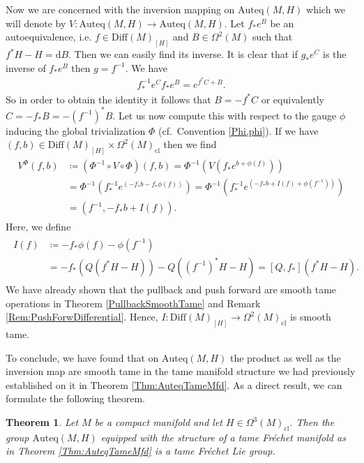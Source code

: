 \documentclass[12pt,a4paper]{article}
\theoremstyle{plain}
\newtheorem{theorem}{Theorem}[subsection]
\theoremstyle{definition}
\newcommand{\Forms}[1]{\Omega^{#1}(M)}
\newcommand{\ClForms}[1]{\Forms{#1}_{\mathrm{cl}}}
\newcommand{\SDiff}{\mathrm{Diff}(M)_{[H]}}
\newcommand{\Auteq}{\mathrm{Auteq}(M,H)}
\renewcommand{\d}{\mathrm{d}}
\begin{document}
Now we are concerned with the inversion mapping on $\Auteq$ which we will denote by $V:\Auteq\to\Auteq$.
Let $f_*e^B$ be an autoequivalence, i.e.
$f\in \SDiff$ and $B\in \Forms{2}$ such that $f^*H-H=\d B$. Then we can easily find its inverse. It is clear that if $g_*e^C$ is the inverse of $f_*e^B$ then $g=f^{-1}$. We have
\begin{align*}
    f^{-1}_*e^Cf_*e^B=e^{f^*C+B}.
\end{align*}
So in order to obtain the identity it follows that $B=-f^*C$ or equivalently
$C=-f_*B=-(f^{-1})^*B$. 
Let us now compute this with respect to the gauge $\phi$ inducing the global trivialization $\Phi$ (cf.~Convention \ref{Phi,phi}).
If we have $(f,b)\in \SDiff\times \ClForms{2}$ then we find
\begin{align}
\begin{split}
\label{Inv}
    V^\Phi(f,b)&\coloneqq (\Phi^{-1}\circ V\circ \Phi)(f,b)=\Phi^{-1}\left(V\left(f_*e^{b+\phi(f)}\right)\right)\\
    &=\Phi^{-1}\left(f^{-1}_*e^{(-f_*b-f_*\phi(f))}\right)=\Phi^{-1}\left(f^{-1}_*e^{(-f_*b+I(f)+\phi(f^{-1}))}\right)\\
    &=(f^{-1},-f_*b+I(f)).
\end{split}
\end{align}
Here, we define 
\begin{align}
\begin{split}
\label{I(f)}
    I(f)&\coloneqq -f_*\phi(f)-\phi(f^{-1})\\
    &= -f_*(Q(f^*H-H))-Q((f^{-1})^*H-H)=[Q,f_*](f^*H-H).
\end{split}
\end{align}
We have already shown that the pullback and push forward are smooth tame operations in Theorem \ref{PullbackSmoothTame} and Remark \ref{Rem:PushForwDifferential}. Hence, $I:\SDiff\to \ClForms{2}$ is smooth tame.

To conclude, we have found that on $\Auteq$ the product as well as the inversion map are smooth tame in the tame manifold structure we had previously established on it in Theorem \ref{Thm:AuteqTameMfd}. As a direct result, we can formulate the following theorem.

\begin{theorem}
\label{Thm:AuteqTameLieGroup}
Let $M$ be a compact manifold and let $H\in \ClForms{3}$. Then the group $\Auteq$ equipped with the structure of a tame Fréchet manifold as in Theorem \ref{Thm:AuteqTameMfd} is a tame Fréchet Lie group.
\end{theorem}
\end{document}
